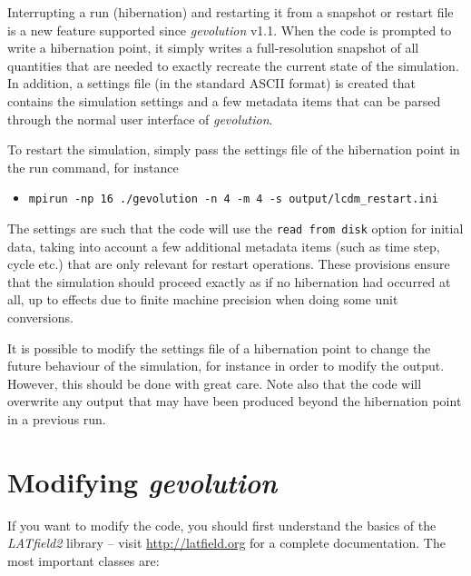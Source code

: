 \documentclass[a4paper,10pt]{article}
\begin{document}
Interrupting a run (hibernation) and restarting it from a snapshot or restart file is a new feature supported since
\textit{gevolution} v1.1. When the code is prompted to write a hibernation point, it simply writes a full-resolution snapshot
of all quantities that are needed to exactly recreate the current state of the simulation. In addition, a settings file (in the
standard ASCII format) is created that contains the simulation settings and a few metadata items that can be parsed through the
normal user interface of \textit{gevolution}.

To restart the simulation, simply pass the settings file of the hibernation point in the run command, for instance

\begin{itemize}
 \item[] \texttt{mpirun -np 16 ./gevolution -n 4 -m 4 -s output/lcdm\_restart.ini} 
\end{itemize}

The settings are such that the code will use the \texttt{read from disk} option for initial data, taking into account a few
additional metadata items (such as time step, cycle etc.) that are only relevant for restart operations. These provisions
ensure that the simulation should proceed exactly as if no hibernation had occurred at all, up to effects due to finite machine
precision when doing some unit conversions.

It is possible to modify the settings file of a hibernation point to change the future behaviour of the simulation, for instance in order
to modify the output. However, this should be done with great care. Note also that the code will overwrite any output that may have
been produced beyond the hibernation point in a previous run.

\section{Modifying \textit{gevolution}}

If you want to modify the code, you should first understand the basics of the \textit{LATfield2} library -- visit \url{http://latfield.org} for a complete documentation. The most important classes are:
\end{document}
